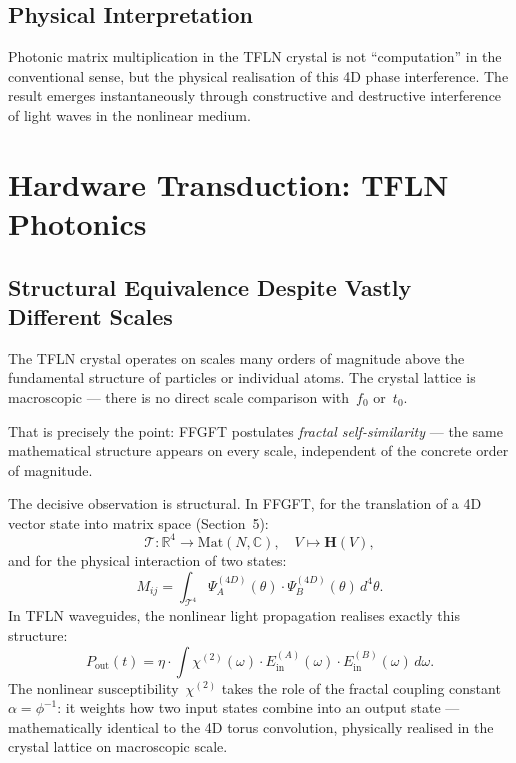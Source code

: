 \subsection{Physical Interpretation}

Photonic matrix multiplication in the TFLN crystal is not ``computation''
in the conventional sense, but the physical realisation of this 4D phase
interference. The result emerges instantaneously through constructive
and destructive interference of light waves in the nonlinear medium.

\section{Hardware Transduction: TFLN Photonics}

\subsection{Structural Equivalence Despite Vastly Different Scales}

\begin{warnbox}
The TFLN crystal operates on scales many orders of magnitude above
the fundamental structure of particles or individual atoms. The
crystal lattice is macroscopic — there is no direct scale comparison
with~$f_0$ or~$t_0$.

That is precisely the point: FFGFT postulates \emph{fractal
self-similarity} — the same mathematical structure appears on every
scale, independent of the concrete order of magnitude.
\end{warnbox}

The decisive observation is structural. In FFGFT, for the translation
of a 4D vector state into matrix space (Section~5):
\begin{equation}
  \mathcal{T}: \mathbb{R}^4 \to \mathrm{Mat}(N,\mathbb{C}),\quad
  V \mapsto \mathbf{H}(V),
\end{equation}
and for the physical interaction of two states:
\begin{equation}
  M_{ij} = \int_{\mathcal{T}^4}
    \Psi_A^{(4D)}(\theta)\cdot\Psi_B^{(4D)}(\theta)\,d^4\theta.
\end{equation}
In TFLN waveguides, the nonlinear light propagation realises exactly
this structure:
\begin{equation}
  P_{\text{out}}(t)
  = \eta \cdot \int \chi^{(2)}(\omega)
    \cdot E_{\text{in}}^{(A)}(\omega)
    \cdot E_{\text{in}}^{(B)}(\omega)\,d\omega.
\end{equation}
The nonlinear susceptibility~$\chi^{(2)}$ takes the role of the fractal
coupling constant~$\alpha = \phi^{-1}$: it weights how two input states
combine into an output state — mathematically identical to the 4D torus
convolution, physically realised in the crystal lattice on macroscopic
scale.


